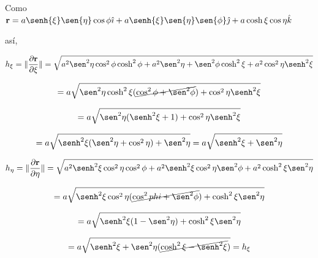 \documentclass[12pt,a4paper]{article}
\providecommand{\norm}[1]{\lVert#1\rVert}
\begin{document}
\begin{enumerate}
\begin{enumerate}
        Como $\textbf{r} = a \senh{\xi} \sen{\eta} \cos{\phi} \hat{\imath} + a \senh{\xi} \sen{\eta} \sen{\phi} \hat{\jmath} + a \cosh{\xi} \cos{\eta} \hat{k}$
        
        así,
        
        \begin{equation*}
            h_\xi = \norm{\frac{\partial \textbf{r}}{\partial \xi}} = \sqrt{a^2 \sen^2{\eta} \cos^2{\phi}\cosh^2{\phi}+ a^2 \sen^2{\eta}+\sen^2{\phi} \cosh^2{\xi} + a^2 \cos^2{\eta} \senh^2{\xi}}
        \end{equation*}
        
        \begin{equation*}
            = a\sqrt{\sen^2{\eta} \cosh^2{\xi}(\cancel{\cos^2{\phi} + \sen^2{\phi}}) + \cos^2{\eta} \senh^2{\xi}}
        \end{equation*}
        
        \begin{equation*}
            = a \sqrt{\sen^2{\eta}(\senh^2{\xi}+1) + \cos^2{\eta} \senh^2{\xi}}
        \end{equation*}
        
        \begin{equation*}
            = a \sqrt{\senh^2{\xi}(\sen^2{\eta} + \cos^2{\eta}) + \sen^2{\eta}}= a\sqrt{\senh^2{\xi} + \sen^2{\eta}}
        \end{equation*}
        
        \begin{equation*}
            h_\eta = \norm{\frac{\partial \textbf{r}}{\partial \eta}} =\sqrt{a^2 \senh^2{\xi}\cos^2{\eta}\cos^2{\phi} + a^2 \senh^2{\xi}\cos^2{\eta}\sen^2{\phi} + a^2 \cosh^2{\xi}\sen^2{\eta}}
        \end{equation*}
        
        \begin{equation*}
           =a\sqrt{\senh^2{\xi}\cos^2{\eta}(\cancel{\cos^2{phi} + \sen^2{\phi}}) + \cosh^2{\xi} \sen^2{\eta}}
        \end{equation*}
        
        \begin{equation*}
            = a \sqrt{\senh^2{\xi} (1 - \sen^2{\eta}) + \cosh^2{\xi} \sen^2{\eta}}
        \end{equation*}
        
        \begin{equation*}
            = a\sqrt{\senh^2{\xi}+\sen^2{\eta} (\cancel{\cosh^2{\xi} - \senh^2{\xi}})} = h_\xi
        \end{equation*}
        

\end{enumerate}
\end{enumerate}
\end{document}
